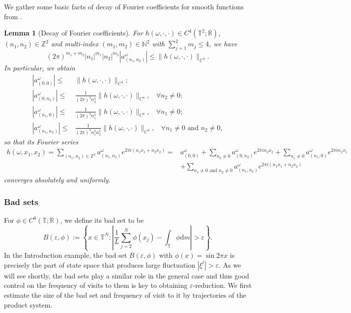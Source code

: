 \documentclass[a4paper]{article}
\theoremstyle{plain}
\newtheorem{lemma}[theorem]{Lemma}
\theoremstyle{definition}
\newcommand{\R}{\mathbb{R}}
\newcommand{\T}{\mathbb{T}}
\newcommand{\Z}{\mathbb{Z}}
\newcommand{\N}{\mathbb{N}}
\begin{document}
We gather some basic facts of decay of Fourier coefficients for smooth functions from \cite[Theorem 3.3.9]{Grafakos2014}.
\begin{lemma}[Decay of Fourier coefficients]\label{cor:decayFouriercoeff}
	For $h(\omega,\cdot,\cdot)\in C^4(\T^2;\R)$, $(n_1,n_2)\in\Z^2$ and multi-index $(m_1,m_2)\in\N^2$ with $\sum_{j=1}^2 m_j\leq 4$, we have
	$$ (2\pi)^{m_1+m_2}|n_1|^{m_1} |n_2|^{m_2} |a^{\omega}_{(n_1,n_2)}|\leq \|h(\omega,\cdot,\cdot)\|_{C^4}.$$
	In particular, we obtain
	\begin{align*}
		|a^{\omega}_{(0,0)}|\leq &\|h(\omega,\cdot,\cdot)\|_{C^4};\\
		|a^{\omega}_{(0,n_2)}|\leq & \frac{1}{(2\pi)^4 n_2^4} \|h(\omega,\cdot,\cdot)\|_{C^4},~~~~\forall n_2\neq 0;\\
		|a^{\omega}_{(n_1,0)}|\leq & \frac{1}{(2\pi)^4 n_1^4} \|h(\omega,\cdot,\cdot)\|_{C^4},~~~~\forall n_1\neq 0;\\
		|a^{\omega}_{(n_1,n_2)}|\leq& \frac{1}{(2\pi)^4 n_1^2 n_2^2}\|h(\omega,\cdot,\cdot)\|_{C^4},~~~~\forall n_1\neq0\text{ and }n_2\neq 0,
	\end{align*}
	so that its Fourier series 
	\begin{align*}
		h(\omega,x_1,x_2) = \sum_{(n_1,n_2)\in\Z^2} a^{\omega}_{(n_1,n_2)} e^{2\pi i (n_1x_1+n_2x_2)} =& a^{\omega}_{(0,0)} + \sum_{n_2\neq 0} a^{\omega}_{(0,n_2)} e^{2\pi i n_2x_2} + \sum_{n_1\neq 0} a^{\omega}_{(n_1,0)} e^{2\pi i n_1x_1}  \\
		&+ \sum_{n_1\neq 0 \text{ and } n_2\neq 0} a^{\omega}_{(n_1,n_2)} e^{2\pi i (n_1x_1+n_2x_2)} 
	\end{align*}
	converges absolutely and uniformly.
\end{lemma}



\subsubsection{Bad sets}
For $\phi\in C^0(\T;\R)$, we define its bad set to be
$$B(\varepsilon ,\phi):=\left\{{x}\in \T^N: \left|\frac{1}{L} \sum_{j=2}^N \phi({x}_j)- \int_{\T} \phi\mathrm{d}m \right|>\varepsilon\right\}.$$
In the Introduction example, the bad set $B(\varepsilon,\phi)$ with $\phi(x)=\sin2\pi x$ is precisely the part of state space that produces large fluctuation $|\xi^t|>\varepsilon$. As we will see shortly, the bad sets play a similar role in the general case and thus good control on the frequency of visits to them is key to obtaining $\varepsilon$-reduction. 
We first estimate the size of the bad set and frequency of visit to it by trajectories of the product system.
\end{document}
